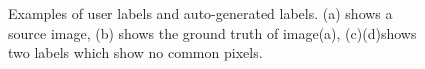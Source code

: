 \documentclass[runningheads,a4paper]{llncs}
\begin{document}
\begin{figure}[!htb]
\centering
{}
\caption{ Examples of user labels and auto-generated labels. (a) shows a source image, (b) shows the ground truth of image(a), (c)(d)shows two labels which show no common pixels. }
\label{fig:seg-inter}
\end{figure}
\end{document}
